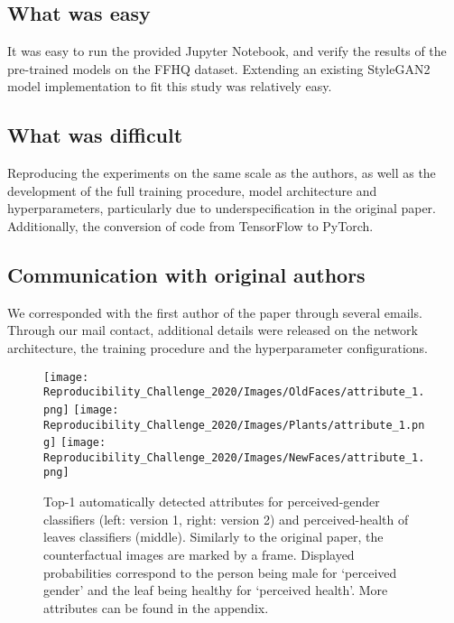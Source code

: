 \subsection*{What was easy}

It was easy to run the provided Jupyter Notebook, and verify the results of the pre-trained models on the FFHQ dataset. Extending an existing StyleGAN2 model implementation to fit this study was relatively easy.


\subsection*{What was difficult}

Reproducing the experiments on the same scale as the authors, as well as the development of the full training procedure, model architecture and hyperparameters, particularly due to underspecification in the original paper. Additionally, the conversion of code from TensorFlow to PyTorch.


\subsection*{Communication with original authors}

We corresponded with the first author of the paper through several emails. Through our mail contact, additional details were released on the network architecture, the training procedure and the hyperparameter configurations.



\newpage
\begin{figure}[!htb]
  \texttt{[image: Reproducibility\_Challenge\_2020/Images/OldFaces/attribute\_1.png]}
\endminipage\hfill
{}
  \texttt{[image: Reproducibility\_Challenge\_2020/Images/Plants/attribute\_1.png]}
\endminipage\hfill
{}
  \texttt{[image: Reproducibility\_Challenge\_2020/Images/NewFaces/attribute\_1.png]}
\endminipage\hfill
\caption{Top-1 automatically detected attributes for perceived-gender classifiers (left: version 1, right: version 2) and perceived-health of leaves classifiers (middle). Similarly to the original paper, the counterfactual images are marked by a frame. Displayed probabilities correspond to the person being male for `perceived gender' and the leaf being healthy for `perceived health'. More attributes can be found in the appendix.}
\label{fig: introduction}
\end{figure}


